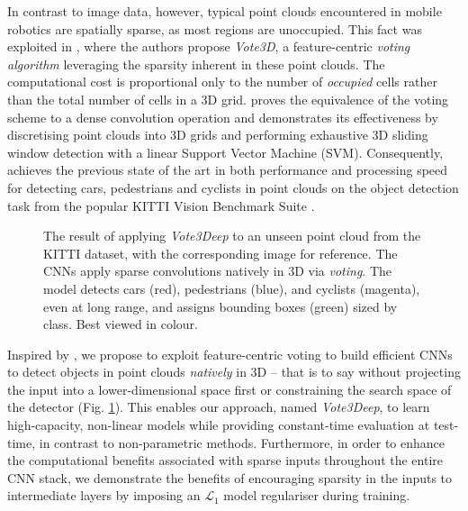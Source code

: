 \documentclass[letterpaper, 10 pt, conference]{tex_style/ieeeconf}
\begin{document}
In contrast to image data, however, typical point clouds encountered in mobile robotics are spatially sparse, as most regions are unoccupied.
This fact was exploited in \cite{wang2015voting}, where the authors propose \emph{Vote3D}, a feature-centric \emph{voting algorithm} leveraging the sparsity inherent in these point clouds.
The computational cost is proportional only to the number of \emph{occupied} cells rather than the total number of cells in a 3D grid.
\cite{wang2015voting} proves the equivalence of the voting scheme to a dense convolution operation and demonstrates its effectiveness by discretising point clouds into 3D grids and performing exhaustive 3D sliding window detection with a linear Support Vector Machine (SVM). Consequently, \cite{wang2015voting} achieves the previous state of the art in both performance and processing speed for detecting cars, pedestrians and cyclists in point clouds on the object detection task from the popular KITTI Vision Benchmark Suite \cite{Geiger2012CVPR}.

\begin{figure}[t]
    \parbox[t]{\columnwidth}{
    \centering
{}
    \caption{The result of applying \emph{Vote3Deep} to an unseen point cloud from the KITTI dataset, with the corresponding image for reference. The CNNs apply sparse convolutions natively in 3D via \emph{voting}. The model detects cars (red), pedestrians (blue), and cyclists (magenta), even at long range, and assigns bounding boxes (green) sized by class. Best viewed in colour.}
    \label{fig:pc_detections}}
\end{figure}

Inspired by \cite{wang2015voting}, we propose to exploit feature-centric voting to build efficient CNNs to detect objects in point clouds \emph{natively} in 3D -- that is to say without projecting the input into a lower-dimensional space first or constraining the search space of the detector (Fig. \ref{fig:pc_detections}).
This enables our approach, named \emph{Vote3Deep}, to learn high-capacity, non-linear models while providing constant-time evaluation at test-time, in contrast to non-parametric methods.
Furthermore, in order to enhance the computational benefits associated with sparse inputs throughout the entire CNN stack, we demonstrate the benefits of encouraging sparsity in the inputs to intermediate layers by imposing an $\mathcal{L}_1$ model regulariser during training.
\end{document}
